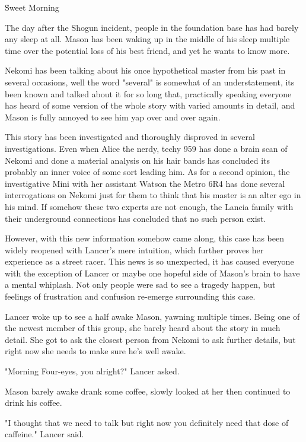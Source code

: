 \h {Sweet Morning}

The day after the Shogun incident, people in the foundation base has had barely any sleep at all. 
Mason has been waking up in the middle of his sleep multiple time over the potential loss of his best friend, and yet he wants to know more. 

Nekomi has been talking about his once hypothetical master from his past in several occasions, well the word "several" is somewhat of an understatement, its been known and talked about it for so long that, practically speaking everyone has heard of some version of the whole story with varied amounts in detail, and Mason is fully annoyed to see him yap over and over again. 

This story has been investigated and thoroughly disproved in several investigations. 
Even when Alice the nerdy, techy 959 has done a brain scan of Nekomi and done a material analysis on his hair bands has concluded its probably an inner voice of some sort leading him. 
As for a second opinion, the investigative Mini with her assistant Watson the Metro 6R4 has done several interrogations on Nekomi just for them to think that his master is an alter ego in his mind.
If somehow these two experts are not enough, the Lancia family with their underground connections has concluded that no such person exist. 

However, with this new information somehow came along, this case has been widely reopened with Lancer's mere intuition, which further proves her experience as a street racer. 
This news is so unexpected, it has caused everyone with the exception of Lancer or maybe one hopeful side of Mason's brain to have a mental whiplash. 
Not only people were sad to see a tragedy happen, but feelings of frustration and confusion re-emerge surrounding this case.

Lancer woke up to see a half awake Mason, yawning multiple times. 
Being one of the newest member of this group, she barely heard about the story in much detail. 
She got to ask the closest person from Nekomi to ask further details, but right now she needs to make sure he's well awake. 

"Morning Four-eyes, you alright?" Lancer asked.

Mason barely awake drank some coffee, slowly looked at her then continued to drink his coffee. 

"I thought that we need to talk but right now you definitely need that dose of caffeine." Lancer said. 

